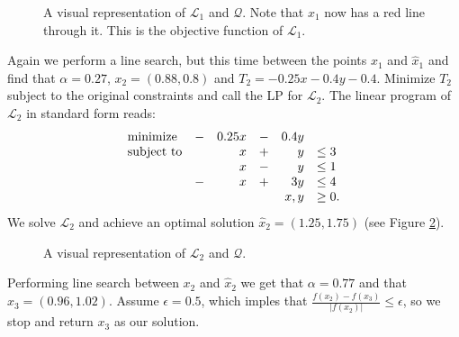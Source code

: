 \begin{figure}[ht!]
\centering

\caption{A visual representation of $\mathcal{L}_1$ and $\mathcal{Q}$.
         Note that $x_1$ now has a red line through it. This is
         the objective function of $\mathcal{L}_1$.}
\label{fig:lp2}
\end{figure}

Again we perform a line search, but this time between the points $x_1$ and
$\hat{x}_1$ and find that $\alpha = 0.27$, $x_2 = (0.88, 0.8)$ and
$T_2 = -0.25x -0.4y -0.4$.
Minimize $T_2$ subject to the original constraints and call the LP for
$\mathcal{L}_2$.
The linear program of $\mathcal{L}_2$ in standard form reads:
\[
\begin{array}{lcrcrl}
    \textrm{minimize}   &-& 0.25 x &-& 0.4 y & \\
    \textrm{subject to} & &      x &+&     y & \leq 3 \\
                        & &      x &-&     y & \leq 1 \\
                        &-&      x &+&   3 y & \leq 4 \\
      \multicolumn{5}{r}{x,y}                & \geq 0.
\end{array}
\]
We solve $\mathcal{L}_2$ and achieve an optimal solution $\hat{x}_2
= (1.25, 1.75)$ (see Figure \ref{fig:lp3}).
\begin{figure}[ht!]
\centering

\caption{A visual representation of $\mathcal{L}_2$ and $\mathcal{Q}$.}
\label{fig:lp3}
\end{figure}

Performing line search between $x_2$ and $\hat{x}_2$ we get that
$\alpha = 0.77$ and that $x_3 = (0.96, 1.02)$.
Assume $\epsilon = 0.5$, which imples that
$\frac{f(x_2) - f(x_3)}{|f(x_2)|} \leq \epsilon$, so we stop and return $x_3$
as our solution.
